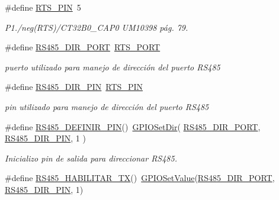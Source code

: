 \begin{DoxyCompactItemize}
\#define \hyperlink{group___d_e_f_i_n_e_s_u_a_r_t_ga4a2c9474c826c040eb2f4d36fdf98509}{R\+T\+S\+\_\+\+P\+IN}~5
\begin{DoxyCompactList}\small\item\em P1./neg(R\+TS)/\+C\+T32\+B0\+\_\+\+C\+A\+P0 U\+M10398 pág. 79. \end{DoxyCompactList}\item 
\#define \hyperlink{group___d_e_f_i_n_e_s_u_a_r_t_gac83cc62ddf027024055e8b2ddbfb14d8}{R\+S485\+\_\+\+D\+I\+R\+\_\+\+P\+O\+RT}~\hyperlink{group___d_e_f_i_n_e_s_u_a_r_t_ga7d503384123e41cba57ad7b306df19d8}{R\+T\+S\+\_\+\+P\+O\+RT}
\begin{DoxyCompactList}\small\item\em puerto utilizado para manejo de dirección del puerto R\+S485 \end{DoxyCompactList}\item 
\#define \hyperlink{group___d_e_f_i_n_e_s_u_a_r_t_ga0c3dd11efc19d493e0776ae590a342fd}{R\+S485\+\_\+\+D\+I\+R\+\_\+\+P\+IN}~\hyperlink{group___d_e_f_i_n_e_s_u_a_r_t_ga4a2c9474c826c040eb2f4d36fdf98509}{R\+T\+S\+\_\+\+P\+IN}
\begin{DoxyCompactList}\small\item\em pin utilizado para manejo de dirección del puerto R\+S485 \end{DoxyCompactList}\item 
\#define \hyperlink{group___d_e_f_i_n_e_s_u_a_r_t_ga6a815f4456be0ae15fd74ff2172d2d4e}{R\+S485\+\_\+\+D\+E\+F\+I\+N\+I\+R\+\_\+\+P\+IN}()~\hyperlink{gpio_8h_a376642dd36001cc5eb409f9c83152e60}{G\+P\+I\+O\+Set\+Dir}( \hyperlink{group___d_e_f_i_n_e_s_u_a_r_t_gac83cc62ddf027024055e8b2ddbfb14d8}{R\+S485\+\_\+\+D\+I\+R\+\_\+\+P\+O\+RT}, \hyperlink{group___d_e_f_i_n_e_s_u_a_r_t_ga0c3dd11efc19d493e0776ae590a342fd}{R\+S485\+\_\+\+D\+I\+R\+\_\+\+P\+IN}, 1 )
\begin{DoxyCompactList}\small\item\em Inicializo pin de salida para direccionar R\+S485. \end{DoxyCompactList}\item 
\#define \hyperlink{group___d_e_f_i_n_e_s_u_a_r_t_gad21e8ee2f3bf01827e41e73325765c8a}{R\+S485\+\_\+\+H\+A\+B\+I\+L\+I\+T\+A\+R\+\_\+\+TX}()~\hyperlink{gpio_8h_a6e2440fb6429a69f1338b51a4cab2921}{G\+P\+I\+O\+Set\+Value}(\hyperlink{group___d_e_f_i_n_e_s_u_a_r_t_gac83cc62ddf027024055e8b2ddbfb14d8}{R\+S485\+\_\+\+D\+I\+R\+\_\+\+P\+O\+RT}, \hyperlink{group___d_e_f_i_n_e_s_u_a_r_t_ga0c3dd11efc19d493e0776ae590a342fd}{R\+S485\+\_\+\+D\+I\+R\+\_\+\+P\+IN}, 1)

\end{DoxyCompactItemize}
